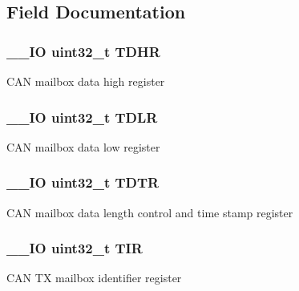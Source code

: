 \subsection{Field Documentation}
\hypertarget{struct_c_a_n___tx_mail_box___type_def_a90f7c1cf22683459c632d6040366eddf}{
\subsubsection[{T\-D\-H\-R}]{\setlength{\rightskip}{0pt plus 5cm}\-\_\-\-\_\-\-I\-O uint32\-\_\-t T\-D\-H\-R}}\label{struct_c_a_n___tx_mail_box___type_def_a90f7c1cf22683459c632d6040366eddf}
C\-A\-N mailbox data high register \hypertarget{struct_c_a_n___tx_mail_box___type_def_aded1359e1a32512910bff534d57ade68}{
\subsubsection[{T\-D\-L\-R}]{\setlength{\rightskip}{0pt plus 5cm}\-\_\-\-\_\-\-I\-O uint32\-\_\-t T\-D\-L\-R}}\label{struct_c_a_n___tx_mail_box___type_def_aded1359e1a32512910bff534d57ade68}
C\-A\-N mailbox data low register \hypertarget{struct_c_a_n___tx_mail_box___type_def_aed87bed042dd9523ce086119a3bab0ea}{
\subsubsection[{T\-D\-T\-R}]{\setlength{\rightskip}{0pt plus 5cm}\-\_\-\-\_\-\-I\-O uint32\-\_\-t T\-D\-T\-R}}\label{struct_c_a_n___tx_mail_box___type_def_aed87bed042dd9523ce086119a3bab0ea}
C\-A\-N mailbox data length control and time stamp register \hypertarget{struct_c_a_n___tx_mail_box___type_def_a6921aa1c578a7d17c6e0eb33a73b6630}{
\subsubsection[{T\-I\-R}]{\setlength{\rightskip}{0pt plus 5cm}\-\_\-\-\_\-\-I\-O uint32\-\_\-t T\-I\-R}}\label{struct_c_a_n___tx_mail_box___type_def_a6921aa1c578a7d17c6e0eb33a73b6630}
C\-A\-N T\-X mailbox identifier register 

